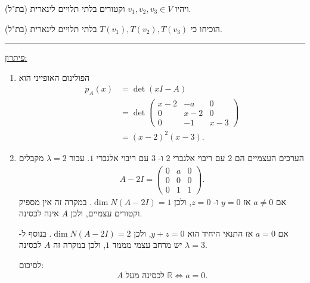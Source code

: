 \documentclass[12pt, a4paper]{article}
\newcommand{\rr}{\mathbb{R}}
\begin{document}
\begin{enumerate}
{\begin{enumerate}
ויהיו
$v_1,v_2,v_3\in V$
וקטורים בלתי תלויים לינארית (בת"ל).

הוכיחו כי
$T(v_1),T(v_2),T(v_3)$
בלתי תלויים לינארית (בת"ל).
\end{enumerate}

}\forthQ
\pagebreak

\setcounter{enumi}{0}
    \firstQ
\noindent\rule{\textwidth-30pt}{0.4pt}
\underline{פיתרון:}

\begin{enumerate}
\item הפולינום האופייני הוא
\begin{align*}
p_A(x)
&=\det(xI-A)\\
&=\det\begin{pmatrix}
x-2&-a&0\\
0&x-2&0\\
0&-1&x-3
\end{pmatrix}\\
&=(x-2)^2(x-3).
\end{align*}

\item הערכים העצמיים הם
$2$
עם ריבוי אלגברי
$2$
ו-
$3$
עם ריבוי אלגברי
$1$.
עבור
$\lambda=2$
מקבלים
\begin{align*}
A-2I=
\begin{pmatrix}
0&a&0\\
0&0&0\\
0&1&1
\end{pmatrix}.
\end{align*}
אם
$a\neq0$
אז
$y=0$
ו-
$z=0$,
ולכן
$\dim N(A-2I)=1$.
במקרה זה אין מספיק וקטורים עצמיים, ולכן
$A$
אינה לכסינה.

אם
$a=0$
אז התנאי היחיד הוא
$y+z=0$,
ולכן
$\dim N(A-2I)=2$.
בנוסף ל-
$\lambda=3$
יש מרחב עצמי מממד
$1$,
ולכן במקרה זה
$A$
לכסינה.

לסיכום:
$$A\text{ לכסינה מעל }\rr \iff a=0.$$


\end{enumerate}
\end{enumerate}
\end{document}
